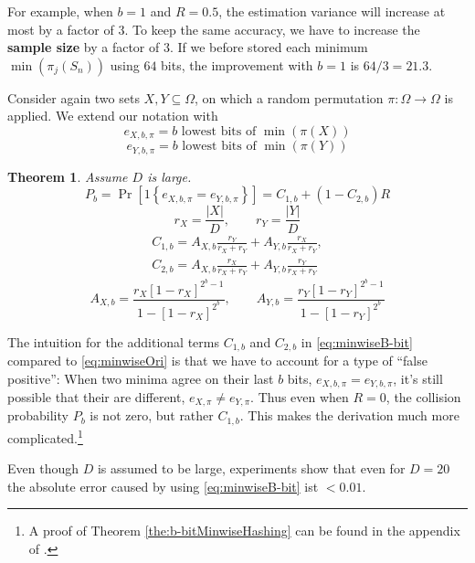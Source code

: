\documentclass[a4paper]{article}
\newtheorem{mytheorem}{Theorem}
\begin{document}
For example, when $b=1$ and $R=0.5$, the estimation variance will increase at most by a factor of $3$. To keep the same accuracy, we have to increase the \textbf{sample size} by a factor of $3$. If we before stored each minimum $\min(\pi_j(S_n))$ using $64$ bits, the improvement with $b=1$ is $64/3=21.3$.

Consider again two sets $X,Y \subseteq \Omega$, on which a random permutation $\pi: \Omega \longrightarrow \Omega$ is applied. We extend our notation with
\[
e_{X,b,\pi}=b \text{ lowest bits of } \min(\pi(X))
\]
\[
e_{Y,b,\pi}=b \text{ lowest bits of } \min(\pi(Y))
\]
\begin{framed}
\begin{mytheorem} \label{the:b-bitMinwiseHashing}
Assume $D$ is large.
\begin{equation}\label{eq:minwiseB-bit}
P_b=\Pr[1\left\lbrace e_{X,b,\pi}=e_{Y,b,\pi}\right\rbrace]=C_{1,b}+(1-C_{2,b})R
\end{equation}
\begin{equation}
r_X=\frac{|X|}{D}, \qquad r_Y=\frac{|Y|}{D}
\end{equation}
\begin{equation}
\begin{split}
C_{1,b}=A_{X,b}\frac{r_Y}{r_X+r_Y}+A_{Y,b}\frac{r_X}{r_X+r_Y},\\
C_{2,b}=A_{X,b}\frac{r_X}{r_X+r_Y}+A_{Y,b}\frac{r_Y}{r_X+r_Y}
\end{split}
\end{equation}
\begin{equation}
A_{X,b}=\frac{r_X[1-r_X]^{2^b-1}}{1-[1-r_X]^{2^b}}, \qquad A_{Y,b}=\frac{r_Y[1-r_Y]^{2^b-1}}{1-[1-r_Y]^{2^b}}
\end{equation}
\end{mytheorem}
\end{framed}

The intuition for the additional terms $C_{1,b}$ and $C_{2,b}$ in \vref{eq:minwiseB-bit} compared to \vref{eq:minwiseOri} is that we have to account for a type of ``false positive'': When two minima agree on their last $b$ bits, $e_{X,b,\pi}=e_{Y,b,\pi}$, it's still possible that their are different, $e_{X,\pi}\neq e_{Y,\pi}$. Thus even when $R=0$, the collision probability $P_b$ is not zero, but rather $C_{1,b}$. This makes the derivation much more complicated.\footnote{A proof of Theorem \vref{the:b-bitMinwiseHashing} can be found in the appendix of \citep{LiK09}.}

Even though $D$ is assumed to be large, experiments show that even for $D=20$ the absolute error caused by using \vref{eq:minwiseB-bit} ist $< 0.01$.
\end{document}
